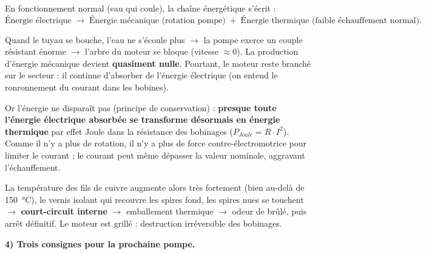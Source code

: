 \documentclass[11pt]{article}
\begin{document}
\begin{exoresolu}
En fonctionnement normal (eau qui coule), la chaîne énergétique s'écrit :
\[ \text{Énergie électrique} \;\rightarrow\; \text{Énergie mécanique (rotation pompe)} \;+\; \text{Énergie thermique (faible échauffement normal)}. \]

Quand le tuyau se bouche, l'eau ne s'écoule plus $\rightarrow$ la pompe exerce un couple résistant énorme $\rightarrow$ l'arbre du moteur se bloque (vitesse $\approx 0$). La production d'énergie mécanique devient \textbf{quasiment nulle}. Pourtant, le moteur reste branché sur le secteur : il continue d'absorber de l'énergie électrique (on entend le \og ronronnement \fg{} du courant dans les bobines).

Or l'énergie ne disparaît pas (principe de conservation) : \textbf{presque toute l'énergie électrique absorbée se transforme désormais en énergie thermique} par effet Joule dans la résistance des bobinages ($P_{Joule} = R \cdot I^2$). Comme il n'y a plus de rotation, il n'y a plus de force contre-électromotrice pour limiter le courant ; le courant peut même dépasser la valeur nominale, aggravant l'échauffement.

La température des fils de cuivre augmente alors très fortement (bien au-delà de \SI{150}{\celsius}), le vernis isolant qui recouvre les spires fond, les spires nues se touchent $\rightarrow$ \textbf{court-circuit interne} $\rightarrow$ emballement thermique $\rightarrow$ odeur de brûlé, puis arrêt définitif. Le moteur est \og grillé \fg{} : destruction irréversible des bobinages.

\textbf{4) Trois consignes pour la prochaine pompe.}


\end{exoresolu}
\end{document}
